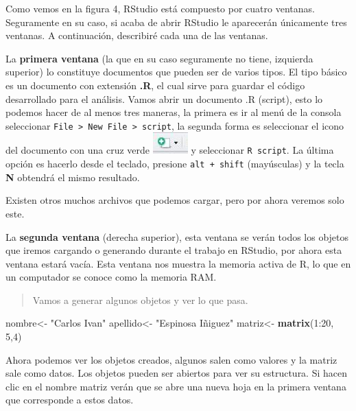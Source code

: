 \documentclass[]{article}
\newenvironment{Shaded}{\begin{snugshade}}{\end{snugshade}}
\newcommand{\KeywordTok}[1]{\textcolor[rgb]{0.13,0.29,0.53}{\textbf{{#1}}}}
\newcommand{\DecValTok}[1]{\textcolor[rgb]{0.00,0.00,0.81}{{#1}}}
\newcommand{\StringTok}[1]{\textcolor[rgb]{0.31,0.60,0.02}{{#1}}}
\newcommand{\NormalTok}[1]{{#1}}
\begin{document}
Como vemos en la figura 4, RStudio está compuesto por cuatro ventanas.
Seguramente en su caso, si acaba de abrir RStudio le aparecerán
únicamente tres ventanas. A continuación, describiré cada una de las
ventanas.

La \textbf{primera ventana} (la que en su caso seguramente no tiene,
izquierda superior) lo constituye documentos que pueden ser de varios
tipos. El tipo básico es un documento con extensión \textbf{.R}, el cual
sirve para guardar el código desarrollado para el análisis. Vamos abrir
un documento .R (script), esto lo podemos hacer de al menos tres
maneras, la primera es ir al menú de la consola seleccionar
\texttt{File\ \textgreater{}\ New\ File\ \textgreater{}\ script}, la
segunda forma es seleccionar el icono del documento con una cruz verde
\includegraphics{imagen/RStudio_nuevo.jpg} y seleccionar
\texttt{R\ script}. La última opción es hacerlo desde el teclado,
presione \texttt{alt\ +\ shift} (mayúsculas) y la tecla \textbf{N}
obtendrá el mismo resultado.

Existen otros muchos archivos que podemos cargar, pero por ahora veremos
solo este.

La \textbf{segunda ventana} (derecha superior), esta ventana se verán
todos los objetos que iremos cargando o generando durante el trabajo en
RStudio, por ahora esta ventana estará vacía. Esta ventana nos muestra
la memoria activa de R, lo que en un computador se conoce como la
memoria RAM.

\begin{quote}
Vamos a generar algunos objetos y ver lo que pasa.
\end{quote}

\begin{Shaded}
\begin{Highlighting}[]
\NormalTok{nombre<-}\StringTok{ "Carlos Ivan"}
\NormalTok{apellido<-}\StringTok{ "Espinosa Iñiguez"}
\NormalTok{matriz<-}\StringTok{ }\KeywordTok{matrix}\NormalTok{(}\DecValTok{1}\NormalTok{:}\DecValTok{20}\NormalTok{, }\DecValTok{5}\NormalTok{,}\DecValTok{4}\NormalTok{)}
\end{Highlighting}
\end{Shaded}

Ahora podemos ver los objetos creados, algunos salen como valores y la
matriz sale como datos. Los objetos pueden ser abiertos para ver su
estructura. Si hacen clic en el nombre matriz verán que se abre una
nueva hoja en la primera ventana que corresponde a estos datos.
\end{document}
